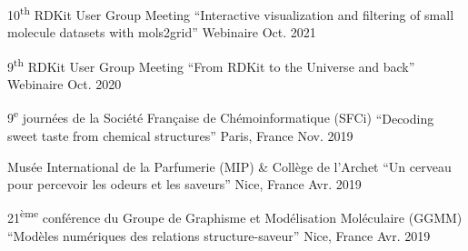 
\begin{cvhonors}

    \cvhonor
    {10\textsuperscript{th} RDKit User Group Meeting}
    {``Interactive visualization and filtering of small molecule datasets with mols2grid''}
    {Webinaire}
    {Oct. 2021}

    \cvhonor
    {9\textsuperscript{th} RDKit User Group Meeting}
    {``From RDKit to the Universe and back''}
    {Webinaire}
    {Oct. 2020}

    \cvhonor
    {9\textsuperscript{e} journées de la Société Française de Chémoinformatique (SFCi)}
    {``Decoding sweet taste from chemical structures''}
    {Paris, France}
    {Nov. 2019}
  
    \cvhonor
    {Musée International de la Parfumerie (MIP) \& Collège de l'Archet}
    {``Un cerveau pour percevoir les odeurs et les saveurs''}
    {Nice, France}
    {Avr. 2019}

    \cvhonor
    {21\textsuperscript{ème} conférence du Groupe de Graphisme et Modélisation Moléculaire (GGMM)}
    {``Modèles numériques des relations structure-saveur''}
    {Nice, France}
    {Avr. 2019}

\end{cvhonors}
